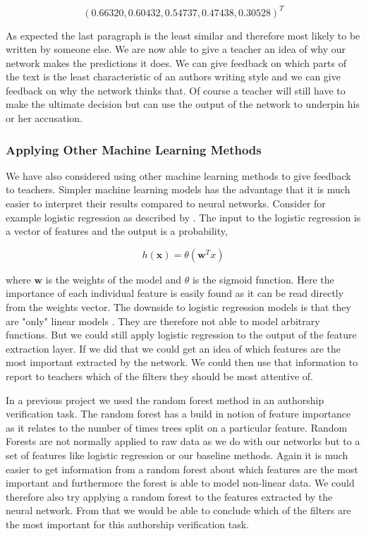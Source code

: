 \begin{equation}
    (0.66320, 0.60432, 0.54737, 0.47438, 0.30528)^T
\end{equation}

As expected the last paragraph is the least similar and therefore most likely to
be written by someone else. We are now able to give a teacher an idea of why our
network makes the predictions it does. We can give feedback on which parts of
the text is the least characteristic of an authors writing style and we can give
feedback on why the network thinks that. Of course a teacher will still have to
make the ultimate decision but can use the output of the network to underpin his
or her accusation.

\subsubsection{Applying Other Machine Learning Methods}

We have also considered using other machine learning methods to give feedback to
teachers. Simpler machine learning models has the advantage that it is much
easier to interpret their results compared to neural networks. Consider for
example logistic regression as described by \citet{Abu-Mostafa:2012:LD:2207825}.
The input to the logistic regression is a vector of features and the output is a
probability,

\begin{equation}
    h(\mathbf{x}) = \theta(\mathbf{w}^Tx)
\end{equation}

where $\mathbf{w}$ is the weights of the model and $\theta$ is the sigmoid
function. Here the importance of each individual feature is easily
found as it can be read directly from the weights vector. The downside
to logistic regression models is that they are "only" linear models
\citet{Abu-Mostafa:2012:LD:2207825}. They are therefore not able to model
arbitrary functions. But we could still apply logistic regression to the output
of the feature extraction layer. If we did that we could get an idea of which
features are the most important extracted by the network. We could then use that
information to report to teachers which of the filters they should be most
attentive of.

In a previous project \citep{US} we used the random forest method in an
authorship verification task. The random forest has a build in notion of feature
importance as it relates to the number of times trees split on a particular
feature. Random Forests are not normally applied to raw data as we do with our
networks but to a set of features like logistic regression or our baseline
methods. Again it is much easier to get information from a random forest about
which features are the most important and furthermore the forest is able to
model non-linear data. We could therefore also try applying a random forest to
the features extracted by the neural network. From that we would be able to
conclude which of the filters are the most important for this authorship
verification task.


